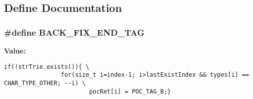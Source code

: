 \subsection{Define Documentation}
\subsubsection[{BACK\_\-FIX\_\-END\_\-TAG}]{\setlength{\rightskip}{0pt plus 5cm}\#define BACK\_\-FIX\_\-END\_\-TAG}\label{CMAPOCTagger_8cc_de4a8a577cf7ba922fe9fd16af219b2f}


\textbf{Value:}

\begin{Code}\begin{verbatim}if(!strTrie.exists()){ \
                for(size_t i=index-1; i>lastExistIndex && types[i] == CHAR_TYPE_OTHER; --i) \
                        pocRet[i] = POC_TAG_B;}
\end{verbatim}
\end{Code}
